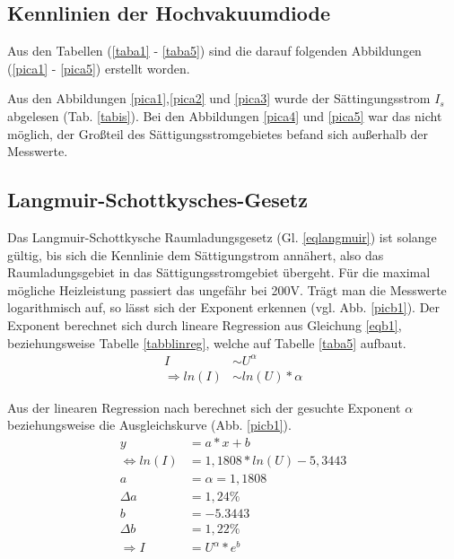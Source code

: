\subsection{Kennlinien der Hochvakuumdiode} 
Aus den Tabellen (\ref{taba1} - \ref{taba5}) sind die darauf folgenden 
Abbildungen (\ref{pica1} - \ref{pica5}) erstellt worden.
    
     
Aus den Abbildungen \ref{pica1},\ref{pica2} und \ref{pica3} wurde der Sättingungsstrom 
$I_s$ abgelesen (Tab. \ref{tabis}). Bei den Abbildungen \ref{pica4} und \ref{pica5} war das 
nicht möglich, der Großteil des Sättigungsstromgebietes befand sich außerhalb der 
Messwerte.

\FloatBarrier
\subsection{Langmuir-Schottkysches-Gesetz}
Das Langmuir-Schottkysche Raumladungsgesetz (Gl. \ref{eqlangmuir}) ist solange gültig, bis sich die Kennlinie
dem Sättigungstrom annähert, also das Raumladungsgebiet in das Sättigungsstromgebiet 
übergeht. Für die maximal mögliche Heizleistung passiert das ungefähr bei 200V.
Trägt man die Messwerte logarithmisch auf, so lässt sich der Exponent erkennen (vgl. 
Abb. \ref{picb1}). Der Exponent berechnet sich durch lineare Regression \cite{linreg}
aus Gleichung \ref{eqb1}, beziehungsweise Tabelle \ref{tabblinreg}, welche auf Tabelle \ref{taba5} aufbaut.
\begin{align}
I&\sim U^\alpha \\
\Rightarrow ln(I)&\sim ln(U)*\alpha \label{eqb1}
\end{align}

\FloatBarrier
Aus der linearen Regression nach \cite{linreg} berechnet sich der gesuchte Exponent $\alpha$ beziehungsweise die Ausgleichskurve (Abb. \ref{picb1}).
\begin{align}
y&=a*x+b \\
\Leftrightarrow ln(I)&=1,1808*ln(U)-5,3443 \\
a&=\alpha=1,1808 \label{exalpha}\\
\Delta a&=1,24\% \\
b&=-5.3443 \\
\Delta b&=1,22\% \\
\Rightarrow I&=U^\alpha*e^b 
\end{align}

\FloatBarrier
